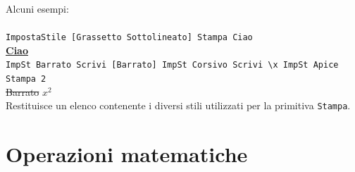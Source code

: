 Alcuni esempi:\\ \\
\texttt{ImpostaStile [Grassetto Sottolineato] Stampa \textquotedbl Ciao}\\
\textbf{\underline{Ciao}}\\
\texttt{ImpSt \textquotedbl Barrato Scrivi [Barrato] ImpSt \textquotedbl Corsivo Scrivi \textquotedbl \textbackslash x ImpSt \textquotedbl Apice Stampa 2}\\
\sout{Barrato} $x^2$\\
Restituisce un elenco contenente i diversi stili utilizzati per la primitiva \texttt{Stampa}.



\section{Operazioni matematiche}

